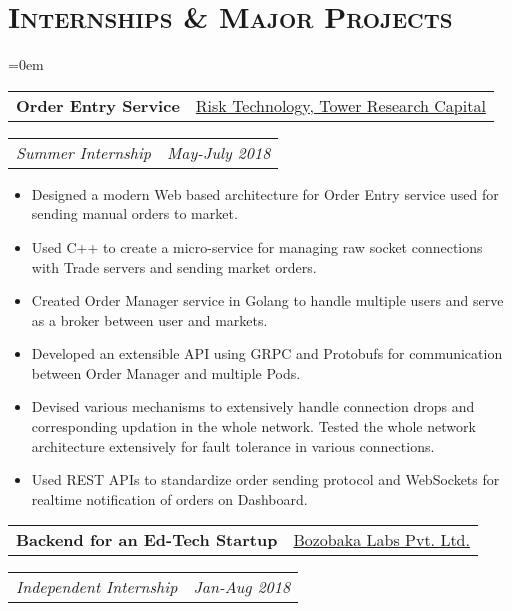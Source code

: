 \documentclass{article}
\makeatletter
\newcommand{\headerrow}[2]
{\begin{tabular*}{\linewidth}{l@{\extracolsep{\fill}}r}
	#1 &
	#2 \\
\end{tabular*}}
\newcommand{\tmpsection}[1]{}
\let\tmpsection=\section
\renewcommand{\section}[1]{\tmpsection*{\textsc{#1}}}
\makeatother
\begin{document}
\section{Internships \& Major Projects}
\begin{list} {}{\leftmargin=0em}
\setlength{\leftmargin}{0pt}

    \item[]
    \headerrow {\textbf{Order Entry Service}}{\underline{Risk Technology, Tower Research Capital}}
    \headerrow {\emph{Summer Internship}}{\emph{May-July 2018}}
    \begin{itemize}
    \setlength\itemsep{0.0em}
	\item Designed a modern Web based architecture for Order Entry service used for sending manual orders to market.
	\item Used C++ to create a micro-service for managing raw socket connections with Trade servers and sending market orders. 
	\item Created Order Manager service in Golang to handle multiple users and serve as a broker between user and markets.
	\item Developed an extensible API using GRPC and Protobufs for communication between Order Manager and multiple Pods.
	\item Devised various mechanisms to extensively handle connection drops and corresponding updation in the whole network. Tested the whole network architecture extensively for fault tolerance in various connections.
    \item Used REST APIs to standardize order sending protocol and WebSockets for realtime notification of orders on Dashboard.
    \end{itemize}
    \item[]
    \headerrow {\textbf{Backend for an Ed-Tech Startup}}{\underline{Bozobaka Labs Pvt. Ltd.}}
    \headerrow {\emph{Independent Internship}}{\emph{Jan-Aug 2018}}
    \begin{itemize}

\end{itemize}
\end{list}
\end{document}
